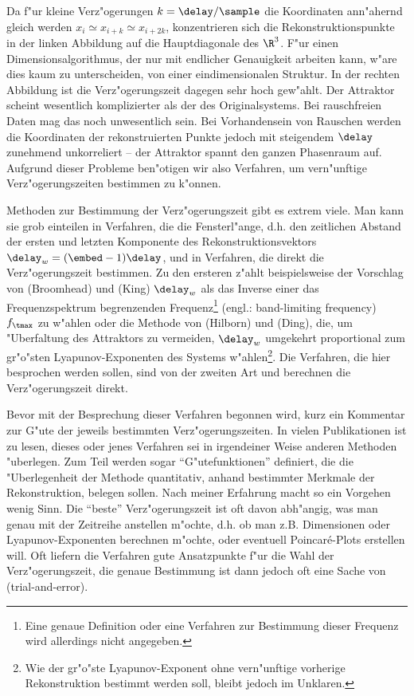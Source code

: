 Da f"ur kleine Verz"ogerungen $k=\delay/\sample$ die Koordinaten ann"ahernd gleich werden
$x_i\simeq x_{i+k}\simeq x_{i+2k}$, konzentrieren sich die Rekonstruktionspunkte in der
linken Abbildung auf die Hauptdiagonale des $\R^3$. F"ur einen Dimensionsalgorithmus, der
nur mit endlicher Genauigkeit arbeiten kann, w"are dies kaum zu unterscheiden, von einer
eindimensionalen Struktur. In der rechten Abbildung ist die Verz"ogerungszeit dagegen sehr
hoch gew"ahlt.  Der Attraktor scheint wesentlich komplizierter als der des
Originalsystems. Bei rauschfreien Daten mag das noch unwesentlich sein. Bei Vorhandensein
von Rauschen werden die Koordinaten der rekonstruierten Punkte jedoch mit
steigendem $\delay$ zunehmend unkorreliert -- der Attraktor spannt den ganzen Phasenraum
auf. Aufgrund dieser Probleme ben"otigen wir also Verfahren, um vern"unftige
Verz"ogerungszeiten bestimmen zu k"onnen.


Methoden zur Bestimmung der Verz"ogerungszeit gibt es extrem viele.  Man kann sie grob
einteilen in Verfahren, die die Fensterl"ange, d.h. den zeitlichen Abstand der ersten und
letzten Komponente des Rekonstruktionsvektors $\delay_w=(\embed-1)\delay$, und in
Verfahren, die direkt die Verz"ogerungszeit bestimmen.  Zu den ersteren z"ahlt
beispielsweise der Vorschlag von \autor(Broomhead) und \autor(King) $\delay_w$ als das
Inverse einer das Frequenzspektrum begrenzenden Frequenz\footnote{Eine genaue Definition
  oder eine Verfahren zur Bestimmung dieser Frequenz wird allerdings nicht angegeben.}
(engl.: band-limiting frequency) $f_\tmax$ zu w"ahlen \cite{Broomhead-king} oder die
Methode von \autor(Hilborn) und \autor(Ding), die, um "Uberfaltung des Attraktors zu
vermeiden, $\delay_w$ umgekehrt proportional zum gr"o"sten Lyapunov-Exponenten des Systems
w"ahlen\footnote{Wie der gr"o"ste Lyapunov-Exponent ohne vern"unftige vorherige
  Rekonstruktion bestimmt werden soll, bleibt jedoch im Unklaren.}. Die Verfahren, die hier
besprochen werden sollen, sind von der zweiten Art und berechnen die Verz"ogerungszeit
direkt.

Bevor mit der Besprechung dieser Verfahren begonnen wird, kurz ein Kommentar zur G"ute der
jeweils bestimmten Verz"ogerungszeiten. In vielen Publikationen ist zu lesen, dieses oder
jenes Verfahren sei in irgendeiner Weise anderen Methoden "uberlegen. Zum Teil werden
sogar ``G"utefunktionen'' definiert, die die "Uberlegenheit der Methode quantitativ,
anhand bestimmter Merkmale der Rekonstruktion, belegen sollen. Nach meiner Erfahrung macht
so ein Vorgehen wenig Sinn. Die ``beste'' Verz"ogerungszeit ist oft davon abh"angig, was
man genau mit der Zeitreihe anstellen m"ochte, d.h. ob man z.B.  Dimensionen oder
Lyapunov-Exponenten berechnen m"ochte, oder eventuell Poincar\'e-Plots erstellen will. Oft
liefern die Verfahren gute Ansatzpunkte f"ur die Wahl der Verz"ogerungszeit, die genaue
Bestimmung ist dann jedoch oft eine Sache von \begriff(trial-and-error).
  

